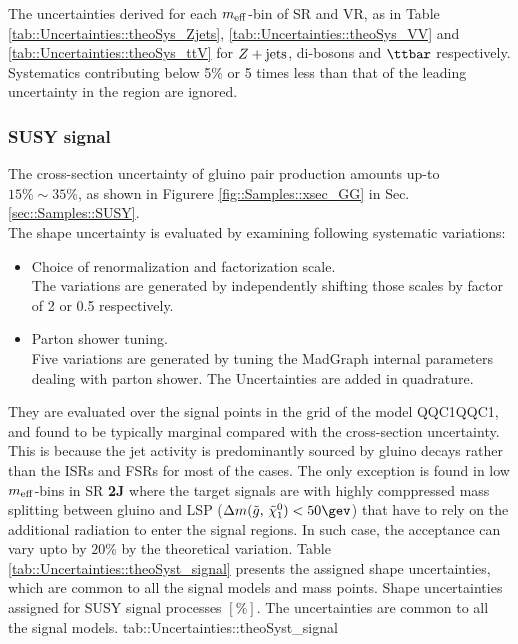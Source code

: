 The uncertainties derived for each $m_{\mathrm{eff}}$-bin of SR and VR, as in Table \ref{tab::Uncertainties::theoSys_Zjets}, \ref{tab::Uncertainties::theoSys_VV} and \ref{tab::Uncertainties::theoSys_ttV} for $Z+\mathrm{jets}$, di-bosons and $\ttbar$ respectively. Systematics contributing below 5$\%$ or 5 times less than that of the leading uncertainty in the region are ignored.  \\




\clearpage
\subsubsection{SUSY signal} 
The cross-section uncertainty of gluino pair production amounts up-to $15\% \sim 35\%$, as shown in Figurere \ref{fig::Samples::xsec_GG} in Sec. \ref{sec::Samples::SUSY}.\\
The shape uncertainty is evaluated by examining following systematic variations:
\begin{itemize}
\item Choice of renormalization and factorization scale.\\
The variations are generated by independently shifting those scales by factor of 2 or 0.5 respectively. 

\item Parton shower tuning.\\
Five variations are generated by tuning the MadGraph internal parameters dealing with parton shower. The Uncertainties are added in quadrature.
\end{itemize}
They are evaluated over the signal points in the \xhalf grid of the model QQC1QQC1, and found to be 
typically marginal compared with the cross-section uncertainty. This is because the jet activity is predominantly sourced by gluino decays rather than the ISRs and FSRs for most of the cases. 
The only exception is found in low $m_{\mathrm{eff}}$-bins in SR \textbf{2J} where the target signals are with highly comppressed mass splitting between gluino and LSP ($\dmg < 50\gev$) that have to rely on the additional radiation to enter the signal regions. In such case, the acceptance can vary upto by $20\%$ by the theoretical variation. Table \ref{tab::Uncertainties::theoSyst_signal} presents the assigned shape uncertainties, which are common to all the signal models and mass points.
{Shape uncertainties assigned for SUSY signal processes $[\%]$. The uncertainties are common to all the signal models.}
{tab::Uncertainties::theoSyst_signal}


